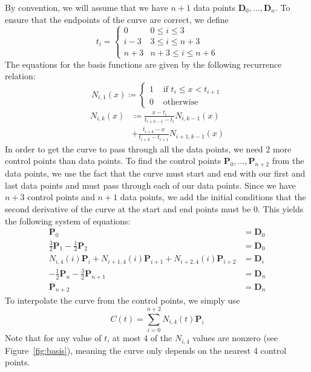 \documentclass[10pt]{article}
\begin{document}
\begin{multicols*}{2}
  By convention, we will assume that we have $n+1$ data points $\mathbf{D}_0,
  \dots, \mathbf{D}_n$. To ensure that the endpoints of the curve are correct,
  we define \[t_i = \begin{cases}
      0 & 0 \le i \le 3 \\
      i-3 & 3 \le i \le n+3 \\
      n+3 & n+3 \le i \le n+6
    \end{cases}
  \]
  The equations for the basis functions are given by the following recurrence
  relation: \cite{wiki:spline}
  \[N_{i,1}(x) \coloneqq \begin{cases}
      1 &\text{ if } t_i \le x < t_{i+1} \\
      0 &\text{ otherwise}
  \end{cases} \]
  \begin{align*}
    N_{i,k}(x) &\coloneqq \frac{x-t_i}{t_{i+k-1}-t_i} N_{i,k-1}(x) \\
    &+ \frac{t_{i+k}-x}{t_{i+k}-t_{i+1}} N_{i+1,k-1}(x)
  \end{align*}
  In order to get the curve to pass through all the data points, we need 2 more
  control points than data points. To find the control points $\mathbf{P}_0,
  \dots, \mathbf{P}_{n+2}$ from the data points, we use the fact that the curve
  must start and end with our first and last data points and must pass through
  each of our data points. Since we have $n+3$ control points and $n+1$ data
  points, we add the initial conditions that the second derivative of the curve
  at the start and end points must be 0. This yields the following system of
  equations:
  \begin{align*}
    \mathbf{P}_0 &= \mathbf{D}_0 \\
    \frac{3}{2} \mathbf{P}_1 - \frac{1}{2} \mathbf{P}_2 &= \mathbf{D}_0 \\
    N_{i,4}(i) \mathbf{P}_i + N_{i+1,4}(i) \mathbf{P}_{i+1} + N_{i+2,4}(i)
    \mathbf{P}_{i+2} &= \mathbf{D}_i \\
    -\frac{1}{2} \mathbf{P}_{n} - \frac{3}{2} \mathbf{P}_{n+1} &= \mathbf{D}_n \\
    \mathbf{P}_{n+2} &= \mathbf{D}_{n}
  \end{align*}
  To interpolate the curve from the control points, we simply use
  \[C(t) = \sum_{i=0}^{n+2} N_{i,4}(t) \mathbf{P}_i\]
  Note that for any value of $t$, at most 4 of the $N_{i,4}$ values are nonzero
  (see Figure~\ref{fig:basis}), meaning the curve only depends on the nearest 4
  control points.


\end{multicols*}
\end{document}
